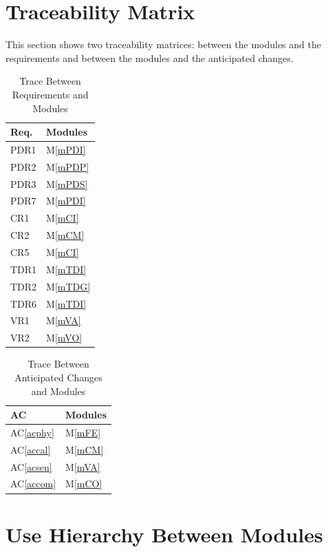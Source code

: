 \documentclass[12pt, titlepage]{article}
\newcommand{\acref}[1]{AC\ref{#1}}
\newcommand{\mref}[1]{M\ref{#1}}
\begin{document}
\section{Traceability Matrix} \label{SecTM}

This section shows two traceability matrices: between the modules and the
requirements and between the modules and the anticipated changes.

\begin{table}[H]
\centering
\begin{tabular}{p{} p{}}
\toprule
\textbf{Req.} & \textbf{Modules}\\
\midrule
PDR1 & \mref{mPDI} \\
PDR2 & \mref{mPDP} \\
PDR3 & \mref{mPDS} \\
PDR7 & \mref{mPDI} \\
CR1 &  \mref{mCI}  \\
CR2 &  \mref{mCM}  \\
CR5 &  \mref{mCI}  \\
TDR1 & \mref{mTDI} \\
TDR2 & \mref{mTDG} \\
TDR6 & \mref{mTDI} \\
VR1 &  \mref{mVA}  \\
VR2 &  \mref{mVO}  \\
\bottomrule
\end{tabular}
\caption{Trace Between Requirements and Modules}
\label{TblRT}
\end{table}

\begin{table}[H]
\centering
\begin{tabular}{p{} p{}}
\toprule
\textbf{AC} & \textbf{Modules}\\
\midrule
\acref{acphy} & \mref{mFE}\\
\acref{accal} & \mref{mCM}\\
\acref{acsen} & \mref{mVA}\\
\acref{accom} & \mref{mCO}\\


\bottomrule
\end{tabular}
\caption{Trace Between Anticipated Changes and Modules}
\label{TblACT}
\end{table}

\section{Use Hierarchy Between Modules} \label{SecUse}
\end{document}
